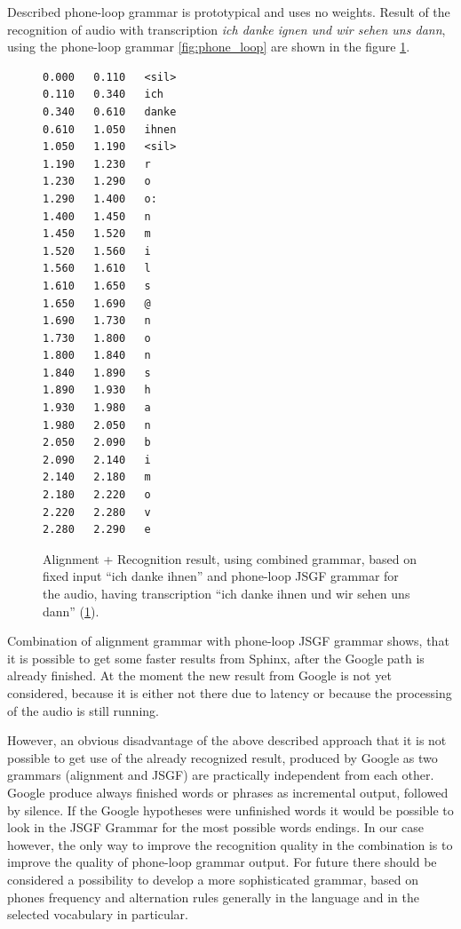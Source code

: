 Described phone-loop grammar is prototypical and uses no weights. Result of the
recognition of audio with transcription \textit {ich danke ignen und wir sehen
uns dann}, using the phone-loop grammar   \ref{fig:phone_loop} are shown in the
figure \ref{fig:phone_loop_res}.
\begin{figure}[htbp]
 \centering 
\begin{center}
\begin{lstlisting}[frame=single]
0.000	0.110	<sil>
0.110	0.340	ich
0.340	0.610	danke
0.610	1.050	ihnen
1.050	1.190	<sil>
1.190	1.230	r
1.230	1.290	o
1.290	1.400	o:
1.400	1.450	n
1.450	1.520	m
1.520	1.560	i
1.560	1.610	l
1.610	1.650	s
1.650	1.690	@
1.690	1.730	n
1.730	1.800	o
1.800	1.840	n
1.840	1.890	s
1.890	1.930	h
1.930	1.980	a
1.980	2.050	n
2.050	2.090	b
2.090	2.140	i
2.140	2.180	m
2.180	2.220	o
2.220	2.280	v
2.280	2.290	e
\end{lstlisting}
\end{center}
 \caption{Alignment + Recognition result, using combined grammar, based on
 fixed input ``ich danke ihnen'' and phone-loop JSGF grammar for the audio,
 having transcription ``ich danke ihnen und wir sehen uns dann''
 (\ref{fig:phone_loop_res}).}
  \label{fig:phone_loop_res}
\end {figure}
Combination of alignment grammar with phone-loop JSGF grammar shows, that it is
possible to get some faster results from Sphinx, after the Google path is
already finished. At the moment the new result from Google is not yet
considered, because it is either not there due to latency or because the
processing of the audio is still running. 


However, an obvious disadvantage of the above described approach that it is not 
possible to get use of the already recognized result, produced by Google as two
grammars (alignment and JSGF) are practically independent from each other.
Google produce always finished words or phrases as incremental output, followed
by silence. If the Google hypotheses were unfinished words it would be possible
to look in the JSGF Grammar for the most possible words endings. In our case
however, the only way to improve the recognition quality in the combination is
to improve the quality of phone-loop grammar output. For future there should be considered a
possibility to develop a more sophisticated grammar, based on phones
frequency and alternation rules generally in the language and in the selected
vocabulary in particular. 
